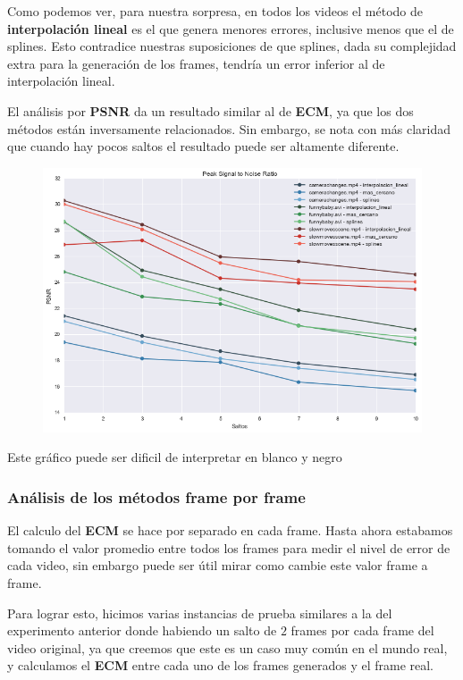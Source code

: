 Como podemos ver, para nuestra sorpresa, en todos los videos el m\'etodo de \textbf{interpolaci\'on
lineal} es el que genera menores errores, inclusive menos que el de splines. Esto contradice nuestras
suposiciones de que splines, dada su complejidad extra para la generaci\'on de los frames, tendr\'ia 
un error inferior al de interpolaci\'on lineal.

El an\'alisis por \textbf{PSNR} da un resultado similar al de \textbf{ECM}, ya
que los dos m\'etodos est\'an inversamente relacionados. Sin embargo, se nota
con m\'as claridad que cuando hay pocos saltos el resultado puede ser altamente
diferente.

\begin{figure}[H]
\centering
\includegraphics[width=.95\textwidth]{graficos/psnr.png}
\end{figure}
\vspace{-2em}
\begin{tiny}Este gr\'afico puede ser dificil de interpretar en blanco y negro\end{tiny}
\vspace{2em}

\subsubsection{An\'alisis de los m\'etodos frame por frame}

El calculo del \textbf{ECM} se hace por separado en cada frame. Hasta ahora
estabamos tomando el valor promedio entre todos los frames para medir el nivel
de error de cada video, sin embargo puede ser \'util mirar como cambie este
valor frame a frame.

Para lograr esto, hicimos varias instancias de prueba similares a la del
experimento anterior donde habiendo un salto de \(2\) frames por cada frame del
video original, ya que creemos que este es un caso muy com\'un en el mundo real,
y calculamos el \textbf{ECM} entre cada uno de los frames generados y el frame
real.

